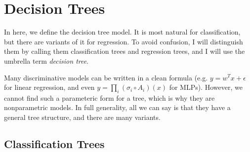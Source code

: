 \section{Decision Trees} 

  In here, we define the decision tree model. It is most natural for classification, but there are variants of it for regression. To avoid confusion, I will distinguish them by calling them classification trees and regression trees, and I will use the umbrella term \textit{decision tree}. 

  Many discriminative models can be written in a clean formula (e.g. $y = w^T x + \epsilon$ for linear regression, and even $y = \prod_i (\sigma_i \circ A_i) (x)$ for MLPs). However, we cannot find such a parameteric form for a tree, which is why they are nonparametric models. In full generality, all we can say is that they have a general tree structure, and there are many variants. 

\subsection{Classification Trees}

